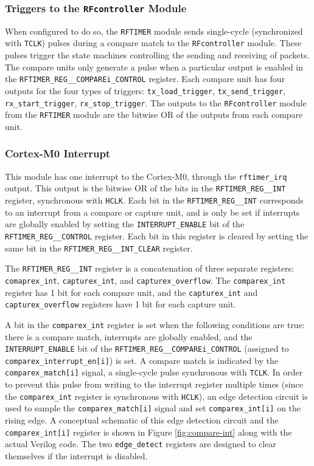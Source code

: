 \subsubsection{Triggers to the \texttt{RFcontroller} Module}
When configured to do so, the \texttt{RFTIMER} module sends single-cycle (synchronized with \texttt{TCLK}) pulses during a compare match to the \texttt{RFcontroller} module. These pulses trigger the state machines controlling the sending and receiving of packets. The compare units only generate a pulse when a particular output is enabled in the \texttt{RFTIMER\_REG\_\_COMPAREi\_CONTROL} register. Each compare unit has four outputs for the four types of triggers: \texttt{tx\_load\_trigger}, \texttt{tx\_send\_trigger}, \texttt{rx\_start\_trigger}, \texttt{rx\_stop\_trigger}. The outputs to the \texttt{RFcontroller} module from the \texttt{RFTIMER} module are the bitwise OR of the outputs from each compare unit.

\subsubsection{Cortex-M0 Interrupt}
This module has one interrupt to the Cortex-M0, through the \texttt{rftimer\_irq} output. This output is the bitwise OR of the bits in the \texttt{RFTIMER\_REG\_\_INT} register, synchronous with \texttt{HCLK}. Each bit in the \texttt{RFTIMER\_REG\_\_INT} corresponds to an interrupt from a compare or capture unit, and is only be set if interrupts are globally enabled by setting the \texttt{INTERRUPT\_ENABLE} bit of the \texttt{RFTIMER\_REG\_\_CONTROL} register. Each bit in this register is cleared by setting the same bit in the \texttt{RFTIMER\_REG\_\_INT\_CLEAR} register.

The \texttt{RFTIMER\_REG\_\_INT} register is a concatenation of three separate registers: \texttt{comaprex\_int}, \texttt{capturex\_int}, and \texttt{capturex\_overflow}. The \texttt{comparex\_int} register has 1 bit for each compare unit, and the \texttt{capturex\_int} and \texttt{capturex\_overflow} registers have 1 bit for each capture unit.

A bit in the \texttt{comparex\_int} register is set when the following conditions are true: there is a compare match, interrupts are globally enabled, and the \texttt{INTERRUPT\_ENABLE} bit of the \texttt{RFTIMER\_REG\_\_COMPAREi\_CONTROL} (assigned to \texttt{comparex\_interrupt\-\_en[i]}) is set. A compare match is indicated by the \texttt{comparex\_match[i]} signal, a single-cycle pulse synchronous with \texttt{TCLK}. In order to prevent this pulse from writing to the interrupt register multiple times (since the \texttt{comparex\_int} register is synchronous with \texttt{HCLK}), an edge detection circuit is used to sample the \texttt{comparex\_match[i]} signal and set \texttt{comparex\_int[i]} on the rising edge. A conceptual schematic of this edge detection circuit and the \texttt{comparex\_int[i]} register is shown in Figure \ref{fig:compare-int} along with the actual Verilog code. The two \texttt{edge\_detect} registers are designed to clear themselves if the interrupt is disabled.

